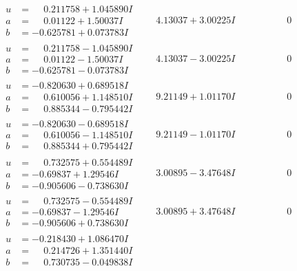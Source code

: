\documentclass[1p]{elsarticle_modified}
\theoremstyle{definition}
\begin{document}
$$\begin{array}{c|c|c}
\begin{aligned}
u &= \phantom{-}0.211758 + 1.045890 I \\
a &= \phantom{-}0.01122 + 1.50037 I \\
b &= -0.625781 + 0.073783 I\end{aligned}
 & \phantom{-}4.13037 + 3.00225 I & \phantom{-0.000000 } 0 \\ \hline\begin{aligned}
u &= \phantom{-}0.211758 - 1.045890 I \\
a &= \phantom{-}0.01122 - 1.50037 I \\
b &= -0.625781 - 0.073783 I\end{aligned}
 & \phantom{-}4.13037 - 3.00225 I & \phantom{-0.000000 } 0 \\ \hline\begin{aligned}
u &= -0.820630 + 0.689518 I \\
a &= \phantom{-}0.610056 + 1.148510 I \\
b &= \phantom{-}0.885344 - 0.795442 I\end{aligned}
 & \phantom{-}9.21149 + 1.01170 I & \phantom{-0.000000 } 0 \\ \hline\begin{aligned}
u &= -0.820630 - 0.689518 I \\
a &= \phantom{-}0.610056 - 1.148510 I \\
b &= \phantom{-}0.885344 + 0.795442 I\end{aligned}
 & \phantom{-}9.21149 - 1.01170 I & \phantom{-0.000000 } 0 \\ \hline\begin{aligned}
u &= \phantom{-}0.732575 + 0.554489 I \\
a &= -0.69837 + 1.29546 I \\
b &= -0.905606 - 0.738630 I\end{aligned}
 & \phantom{-}3.00895 - 3.47648 I & \phantom{-0.000000 } 0 \\ \hline\begin{aligned}
u &= \phantom{-}0.732575 - 0.554489 I \\
a &= -0.69837 - 1.29546 I \\
b &= -0.905606 + 0.738630 I\end{aligned}
 & \phantom{-}3.00895 + 3.47648 I & \phantom{-0.000000 } 0 \\ \hline\begin{aligned}
u &= -0.218430 + 1.086470 I \\
a &= \phantom{-}0.214726 + 1.351440 I \\
b &= \phantom{-}0.730735 - 0.049838 I\end{aligned}

\end{array}$$
\end{document}

